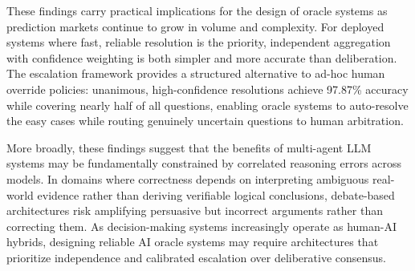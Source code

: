 These findings carry practical implications for the design of oracle systems as prediction markets continue to grow in volume and complexity. For deployed systems where fast, reliable resolution is the priority, independent aggregation with confidence weighting is both simpler and more accurate than deliberation. The escalation framework provides a structured alternative to ad-hoc human override policies: unanimous, high-confidence resolutions achieve 97.87\% accuracy while covering nearly half of all questions, enabling oracle systems to auto-resolve the easy cases while routing genuinely uncertain questions to human arbitration.

More broadly, these findings suggest that the benefits of multi-agent LLM systems may be fundamentally constrained by correlated reasoning errors across models. In domains where correctness depends on interpreting ambiguous real-world evidence rather than deriving verifiable logical conclusions, debate-based architectures risk amplifying persuasive but incorrect arguments rather than correcting them. As decision-making systems increasingly operate as human-AI hybrids, designing reliable AI oracle systems may require architectures that prioritize independence and calibrated escalation over deliberative consensus.